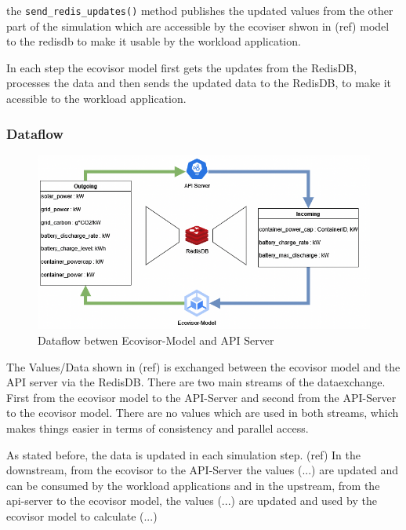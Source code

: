 the \texttt{send\_redis\_updates()} method publishes the updated values from the other part of the simulation which are accessible by the ecoviser shwon in (ref) model to the redisdb to make it
usable by the workload application. %

In each step the ecovisor model first gets the updates from the RedisDB, processes the data and then sends the updated data to the RedisDB, to make it
acessible to the workload application.

\subsubsection{Dataflow}
\label{subsec:dataflow}
\begin{figure}
    \centering
    \includegraphics[width=\linewidth]{figures/Dataflow.drawio.png}
    \caption{Dataflow betwen Ecovisor-Model and API Server}
    \label{fig:dataflow}
\end{figure}

The Values/Data shown in (ref) is exchanged between the ecovisor model and the API server via the RedisDB. There are two main streams of the dataexchange.
First from the ecovisor model to the API-Server and second from the API-Server to the ecovisor model. There are no values which are used in both streams, which makes things
easier in terms of consistency and parallel access.

As stated before, the data is updated in each simulation step. (ref)
In the downstream, from the ecovisor to the API-Server the values (...) are updated and can be consumed by the workload applications
and in the upstream, from the api-server to the ecovisor model, the values (...) are updated and used by the ecovisor model to calculate (...) %

